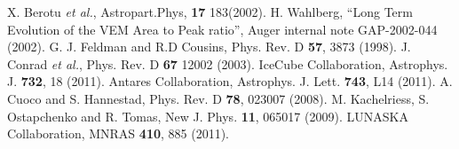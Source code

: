 \begin{thebibliography}{1}
 X. Berotu {\it et al.}, Astropart.Phys, \textbf{17}  183(2002).
% 
 H. Wahlberg, ``Long Term Evolution of the VEM Area to Peak ratio'', 
Auger internal note GAP-2002-044 (2002).
 G. J. Feldman and R.D Cousins, Phys. Rev. D \textbf{57}, 3873 (1998).
 J. Conrad {\it et al.}, Phys. Rev. D \textbf{67} 12002 (2003).
 IceCube Collaboration, Astrophys. J. \textbf{732}, 18 (2011).
 Antares Collaboration, Astrophys. J. Lett. \textbf{743}, L14 (2011).
 A. Cuoco and S. Hannestad, Phys. Rev. D  \textbf{78}, 023007 (2008).
 M. Kachelriess, S. Ostapchenko and R. Tomas, New J. Phys. \textbf{11}, 065017 (2009).
 LUNASKA Collaboration, MNRAS \textbf{410}, 885 (2011).




\end{thebibliography}

